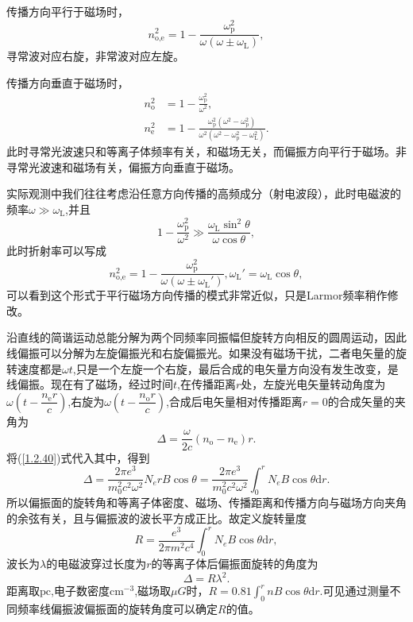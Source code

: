 \documentclass[../天体物理基础.tex]{subfiles}
\begin{document}
传播方向平行于磁场时，
\begin{equation}
n_{\text{o,e}}^{2}=1-\frac{\omega_{\text{p}}^{2}}{\omega\left(\omega\pm\omega_{\text{L}}\right)},
\end{equation}
寻常波对应右旋，非常波对应左旋。

传播方向垂直于磁场时，
\begin{align}
n_{\text{o}}^{2}&=1-\frac{\omega^{2}_{\text{p}}}{\omega^{2}},\\
n_{\text{e}}^{2}&=1-\frac{\omega_{\text{p}}^{2}\left(\omega^{2}-\omega_{\text{p}}^{2}\right)}{\omega^{2}\left(\omega^{2}-\omega_{\text{p}}^{2}-\omega_{\text{L}}^{2}\right)}.
\end{align}
此时寻常光波速只和等离子体频率有关，和磁场无关，而偏振方向平行于磁场。非寻常光波速和磁场有关，偏振方向垂直于磁场。

实际观测中我们往往考虑沿任意方向传播的高频成分（射电波段），此时电磁波的频率$\omega\gg\omega_{\text{L}}$,并且
\begin{equation}
1-\frac{\omega_{\text{p}}^{2}}{\omega^{2}}\gg\frac{\omega_{\text{L}}\sin^{2}\theta}{\omega\cos\theta},
\end{equation}
此时折射率可以写成
\begin{equation}
n^{2}_{\text{o,e}}=1-\frac{\omega_{\text{p}}^{2}}{\omega\left(\omega\pm\omega_{\text{L}}'\right)},\omega_{\text{L}}'=\omega_{\text{L}}\cos\theta,\label{1.2.40}
\end{equation}
可以看到这个形式于平行磁场方向传播的模式非常近似，只是Larmor频率稍作修改。

沿直线的简谐运动总能分解为两个同频率同振幅但旋转方向相反的圆周运动，因此线偏振可以分解为左旋偏振光和右旋偏振光。如果没有磁场干扰，二者电矢量的旋转速度都是$\omega t$,只是一个左旋一个右旋，最后合成的电矢量方向没有发生改变，是线偏振。现在有了磁场，经过时间$t$,在传播距离$r$处，左旋光电矢量转动角度为$\omega\left(t-\dfrac{n_{\text{e}}r}{c}\right)$,右旋为$\omega\left(t-\dfrac{n_{\text{o}}r}{c}\right)$,合成后电矢量相对传播距离$r=0$的合成矢量的夹角为
\begin{equation}
\Delta{}=\frac{\omega}{2c}\left(n_{\text{o}}-n_{\text{e}}\right)r.
\end{equation}
将(\ref{1.2.40})式代入其中，得到
\begin{equation}
\Delta{}=\frac{2\pi e^{3}}{m_{0}^{2}c^{2}\omega^{2}}N_{e}rB\cos\theta=\frac{2\pi e^{3}}{m_{0}^{2}c^{2}\omega^{2}}\int_{0}^{r}N_{e}B\cos\theta\mathrm{d}r.
\end{equation}
所以偏振面的旋转角和等离子体密度、磁场、传播距离和传播方向与磁场方向夹角的余弦有关，且与偏振波的波长平方成正比。故定义旋转量度
\begin{equation}
R=\frac{e^{3}}{2\pi m^{2}c^{4}}\int_{0}^{r}N_{e}B\cos\theta\mathrm{d}r,
\end{equation}
波长为$\lambda$的电磁波穿过长度为$r$的等离子体后偏振面旋转的角度为
\begin{equation}
\Delta{}=R\lambda^{2}.
\end{equation}
距离取$\mathrm{pc}$,电子数密度$\mathrm{cm^{-3}}$,磁场取$\mu G$时，$R=0.81\int_{0}^{r}nB\cos\theta\mathrm{d}r$.可见通过测量不同频率线偏振波偏振面的旋转角度可以确定$R$的值。
\end{document}
